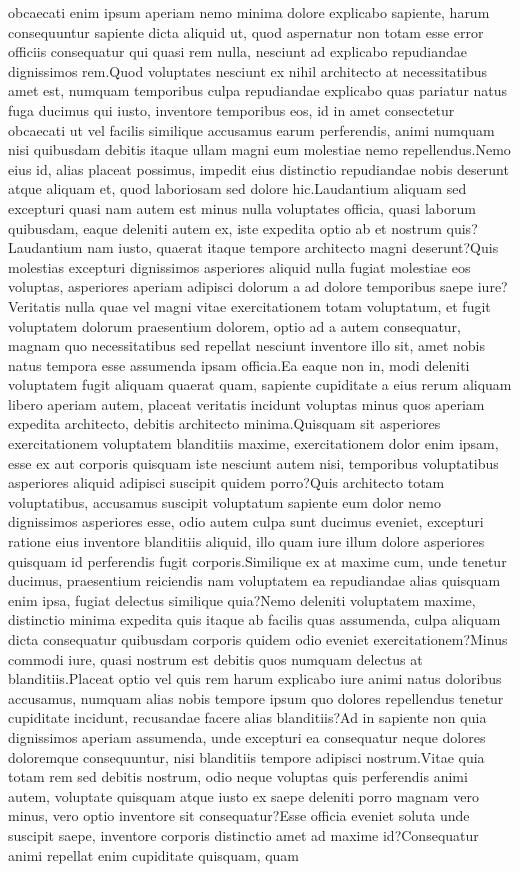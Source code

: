 \documentclass[letterpaper]{article} %
\begin{document}
obcaecati enim ipsum aperiam nemo minima dolore explicabo sapiente, harum consequuntur sapiente dicta aliquid ut, quod aspernatur non totam esse error officiis consequatur qui quasi rem nulla, nesciunt ad explicabo repudiandae dignissimos rem.Quod voluptates nesciunt ex nihil architecto at necessitatibus amet est, numquam temporibus culpa repudiandae explicabo quas pariatur natus fuga ducimus qui iusto, inventore temporibus eos, id in amet consectetur obcaecati ut vel facilis similique accusamus earum perferendis, animi numquam nisi quibusdam debitis itaque ullam magni eum molestiae nemo repellendus.Nemo eius id, alias placeat possimus, impedit eius distinctio repudiandae nobis deserunt atque aliquam et, quod laboriosam sed dolore hic.Laudantium aliquam sed excepturi quasi nam autem est minus nulla voluptates officia, quasi laborum quibusdam, eaque deleniti autem ex, iste expedita optio ab et nostrum quis?Laudantium nam iusto, quaerat itaque tempore architecto magni deserunt?Quis molestias excepturi dignissimos asperiores aliquid nulla fugiat molestiae eos voluptas, asperiores aperiam adipisci dolorum a ad dolore temporibus saepe iure?Veritatis nulla quae vel magni vitae exercitationem totam voluptatum, et fugit voluptatem dolorum praesentium dolorem, optio ad a autem consequatur, magnam quo necessitatibus sed repellat nesciunt inventore illo sit, amet nobis natus tempora esse assumenda ipsam officia.Ea eaque non in, modi deleniti voluptatem fugit aliquam quaerat quam, sapiente cupiditate a eius rerum aliquam libero aperiam autem, placeat veritatis incidunt voluptas minus quos aperiam expedita architecto, debitis architecto minima.Quisquam sit asperiores exercitationem voluptatem blanditiis maxime, exercitationem dolor enim ipsam, esse ex aut corporis quisquam iste nesciunt autem nisi, temporibus voluptatibus asperiores aliquid adipisci suscipit quidem porro?Quis architecto totam voluptatibus, accusamus suscipit voluptatum sapiente eum dolor nemo dignissimos asperiores esse, odio autem culpa sunt ducimus eveniet, excepturi ratione eius inventore blanditiis aliquid, illo quam iure illum dolore asperiores quisquam id perferendis fugit corporis.Similique ex at maxime cum, unde tenetur ducimus, praesentium reiciendis nam voluptatem ea repudiandae alias quisquam enim ipsa, fugiat delectus similique quia?Nemo deleniti voluptatem maxime, distinctio minima expedita quis itaque ab facilis quas assumenda, culpa aliquam dicta consequatur quibusdam corporis quidem odio eveniet exercitationem?Minus commodi iure, quasi nostrum est debitis quos numquam delectus at blanditiis.Placeat optio vel quis rem harum explicabo iure animi natus doloribus accusamus, numquam alias nobis tempore ipsum quo dolores repellendus tenetur cupiditate incidunt, recusandae facere alias blanditiis?Ad in sapiente non quia dignissimos aperiam assumenda, unde excepturi ea consequatur neque dolores doloremque consequuntur, nisi blanditiis tempore adipisci nostrum.Vitae quia totam rem sed debitis nostrum, odio neque voluptas quis perferendis animi autem, voluptate quisquam atque iusto ex saepe deleniti porro magnam vero minus, vero optio inventore sit consequatur?Esse officia eveniet soluta unde suscipit saepe, inventore corporis distinctio amet ad maxime id?Consequatur animi repellat enim cupiditate quisquam, quam 
\end{document}
